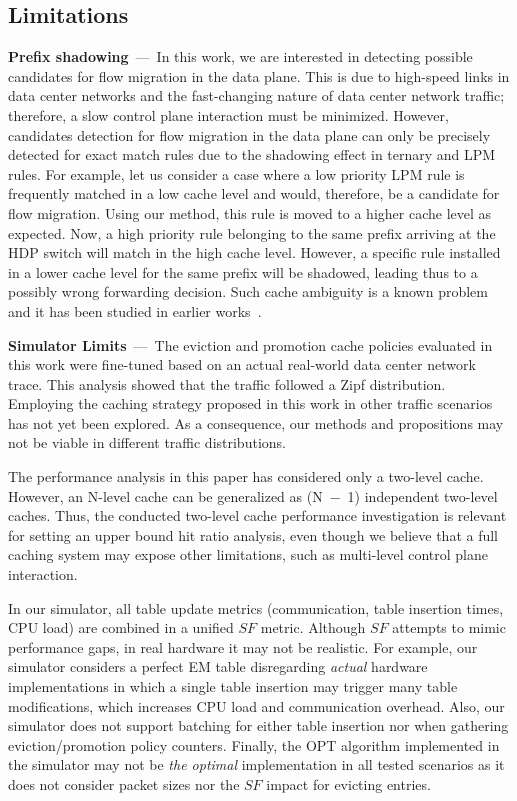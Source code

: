 \subsection{Limitations}\label{sec:method:limitations}

\textbf{Prefix shadowing}~---~In this work, we are interested in detecting possible candidates for flow migration in the data plane.
This is due to high-speed links in data center networks and the fast-changing nature of data center network traffic; therefore, a slow control plane interaction must be minimized.
However, candidates detection for flow migration in the data plane can only be precisely detected for exact match rules due to the shadowing effect in ternary and LPM rules.
For example, let us consider a case where a low priority LPM rule is frequently matched in a low cache level and would, therefore, be a candidate for flow migration.
Using our method, this rule is moved to a higher cache level as expected.
Now, a high priority rule belonging to the same prefix arriving at the HDP switch will match in the high cache level.
However, a specific rule installed in a lower cache level for the same prefix will be shadowed, leading thus to a possibly wrong forwarding decision.   
Such cache ambiguity is a known problem and it has been studied in earlier works~\cite{Degermark:1997, Katta:2014}.

\textbf{Simulator Limits}~---~The eviction and promotion cache policies evaluated in this work were fine-tuned based on an actual real-world data center network trace.
This analysis showed that the traffic followed a Zipf distribution.
Employing the caching strategy proposed in this work in other traffic scenarios has not yet been explored.
As a consequence, our methods and propositions may not be viable in different traffic distributions.

The performance analysis in this paper has considered only a two-level cache.
However, an N-level cache can be generalized as (N~$-$~1) independent two-level caches.
Thus, the conducted two-level cache performance investigation is relevant for setting an upper bound hit ratio analysis, even though we believe that a full caching system may expose other limitations, such as multi-level control plane interaction.

In our simulator, all table update metrics (communication, table insertion times, CPU load) are combined in a unified $SF$ metric.
Although $SF$ attempts to mimic performance gaps, in real hardware it may not be realistic.
For example, our simulator considers a perfect EM table disregarding \textit{actual} hardware implementations in which a single table insertion may trigger many table modifications, which increases CPU load and communication overhead.
Also, our simulator does not support batching for either table insertion nor when gathering eviction/promotion policy counters.
Finally, the OPT algorithm implemented in the simulator may not be \textit{the optimal} implementation in all tested scenarios as it does not consider packet sizes nor the $SF$ impact for evicting entries.

